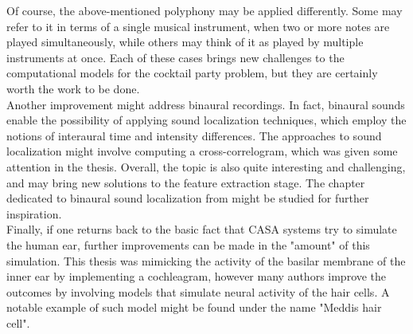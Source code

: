 Of course, the above-mentioned polyphony may be applied differently. Some may refer to it in terms of a single musical instrument, when two or more notes are played simultaneously, while others may think of it as played by multiple instruments at once. Each of these cases brings new challenges to the computational models for the cocktail party problem, but they are certainly worth the work to be done.\\

Another improvement might address binaural recordings. In fact, binaural sounds enable the possibility of applying sound localization techniques, which employ the notions of interaural time and intensity differences. The approaches to sound localization might involve computing a cross-correlogram, which was given some attention in the thesis. Overall, the topic is also quite interesting and challenging, and may bring new solutions to the feature extraction stage. The chapter dedicated to binaural sound localization from \cite{Wang2006} might be studied for further inspiration.\\

Finally, if one returns back to the basic fact that CASA systems try to simulate the human ear, further improvements can be made in the "amount" of this simulation. This thesis was mimicking the activity of the basilar membrane of the inner ear by implementing a cochleagram, however many authors improve the outcomes by involving models that simulate neural activity of the hair cells. A notable example of such model might be found under the name "Meddis hair cell".
